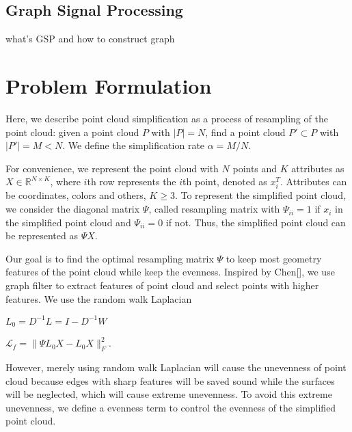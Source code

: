 \documentclass[10pt,conference,a4paper]{IEEEtran}
\begin{document}
\subsection{Graph Signal Processing}

what's GSP and how to construct graph

\section{Problem Formulation}

Here, we describe point cloud simplification as a process of 
resampling of the point cloud: given a point cloud $P$ with 
$|P|=N$, find a point cloud $P' \subset P$ with $|P'|=M<N$. 
We define the simplification rate $\alpha=M/N$. 

For convenience, we represent the point cloud with $N$ points
and $K$ attributes as $X \in \mathbb R^{N \times K}$, 
where $i$th row represents the $i$th point, denoted as $x_i^T$. 
Attributes can be coordinates, colors and others, $K \ge 3$.
To represent the simplified point cloud, we consider the diagonal 
matrix $\Psi$, called resampling matrix with $\Psi_{ii}=1$ if 
$x_i$ in the simplified point cloud and $\Psi_{ii}=0$ if not. 
Thus, the simplified point cloud can be represented as $\Psi X$.

Our goal is to find the optimal resampling matrix $\Psi$ to keep 
most geometry features of the point cloud while keep the evenness. 
Inspired by Chen[], we use graph filter to extract features of point 
cloud and select points with higher features. We use the random walk 
Laplacian
\begin{center}
$L_0=D^{-1}L=I-D^{-1}W$
\end{center}
\begin{center}
$\mathcal{L}_f=\lVert\Psi L_0X-L_0X\rVert^2_F$.
\end{center}

However, merely using random walk Laplacian will cause the unevenness 
of point cloud because edges with sharp features will be saved sound 
while the surfaces will be neglected, which will cause extreme 
unevenness. To avoid this extreme unevenness, we define a evenness 
term to control the evenness of the simplified point cloud. 
\end{document}
